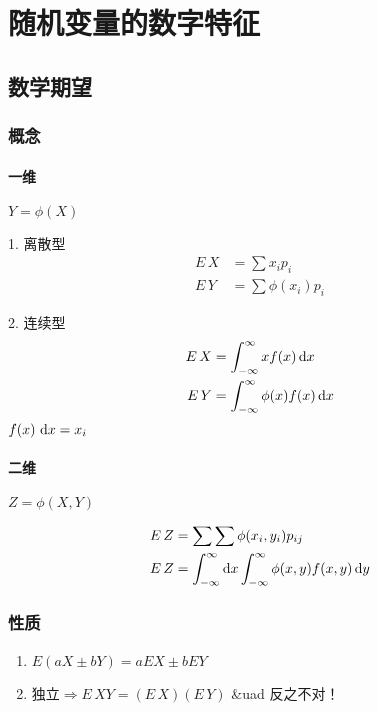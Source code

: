 \chapter{随机变量的数字特征}

\section{数学期望}
\label{sec:数学期望}

\subsection{概念}
\label{sub:概念}

\subsubsection{一维}
\label{ssub:一维}

$ Y = \phi(X) $

1. 离散型
\[
    \begin{aligned}
        E\,X &= \sum x_i p_i \\
        E\,Y &= \sum \phi(x_i) p_i
    \end{aligned}
\]

2. 连续型
\[
    \begin{aligned}
        E\,X &= \int_{-\infty}^{\infty} x f(x) \dif x \\
        E\,Y &= \int_{-\infty}^{\infty} \phi(x) f(x) \dif x
    \end{aligned}
\]
$f(x)\, \dif x = x_i$

\subsubsection{二维}
\label{ssub:二维}

$Z = \phi(X, Y)$

\[
    \begin{aligned}
        E\,Z &= \sum \sum \phi(x_i, y_i)  p_{ij} \\
        E\,Z &= \int_{-\infty}^{\infty} \dif x \int_{-\infty}^{\infty}\phi(x,y) f(x,y) \dif y
    \end{aligned}
\]

\subsection{性质}
\label{sub:性质}

\begin{enumerate}
    \item $E(aX \pm bY) = aEX \pm bEY$
    \item $\text{独立} \Rightarrow E\,XY = (E\,X) (E\,Y)$ \&uad 反之不对！
\end{enumerate}

